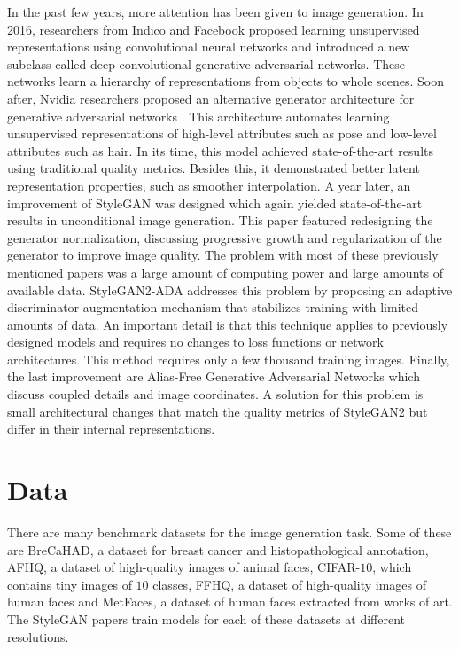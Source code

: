 \documentclass[conference]{IEEEtran}
\begin{document}
In the past few years, more attention has been given to image generation. In 2016, researchers from Indico and Facebook \cite{DCGAN} proposed learning unsupervised representations using convolutional neural networks and introduced a new subclass called deep convolutional generative adversarial networks. These networks learn a hierarchy of representations from objects to whole scenes. Soon after, Nvidia researchers proposed an alternative generator architecture for generative adversarial networks \cite{STYLEGAN}. This architecture automates learning unsupervised representations of high-level attributes such as pose and low-level attributes such as hair. In its time, this model achieved state-of-the-art results using traditional quality metrics. Besides this, it demonstrated better latent representation properties, such as smoother interpolation. A year later, an improvement of StyleGAN was designed \cite{STYLEGAN2} which again yielded state-of-the-art results in unconditional image generation. This paper featured redesigning the generator normalization, discussing progressive growth and regularization of the generator to improve image quality. The problem with most of these previously mentioned papers was a large amount of computing power and large amounts of available data. StyleGAN2-ADA \cite{STYLEGAN2ADA} addresses this problem by proposing an adaptive discriminator augmentation mechanism that stabilizes training with limited amounts of data. An important detail is that this technique applies to previously designed models and requires no changes to loss functions or network architectures. This method requires only a few thousand training images. Finally, the last improvement are Alias-Free Generative Adversarial Networks \cite{STYLEGAN3} which discuss coupled details and image coordinates. A solution for this problem is small architectural changes that match the quality metrics of StyleGAN2 but differ in their internal representations.

\section{Data}
There are many benchmark datasets for the image generation task. Some of these are BreCaHAD, a dataset for breast cancer and histopathological annotation, AFHQ, a dataset of high-quality images of animal faces, CIFAR-$10$, which contains tiny images of $10$ classes, FFHQ, a dataset of high-quality images of human faces and MetFaces, a dataset of human faces extracted from works of art. The StyleGAN papers train models for each of these datasets at different resolutions.
\end{document}
